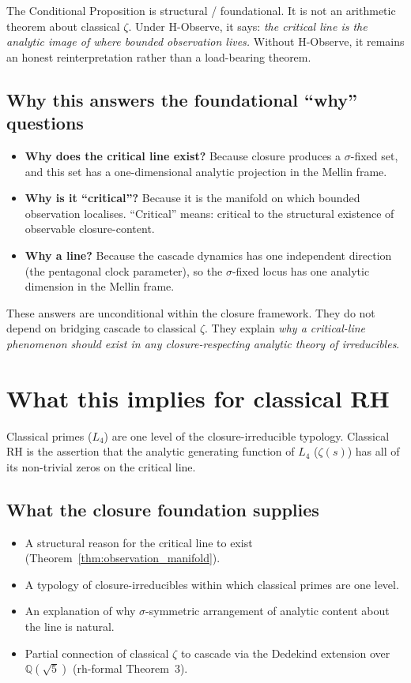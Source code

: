 \documentclass[11pt,a4paper]{article}
\theoremstyle{definition}
\theoremstyle{remark}
\begin{document}
The Conditional Proposition is structural / foundational. It is not an
arithmetic theorem about classical $\zeta$. Under H-Observe, it says:
\emph{the critical line is the analytic image of where bounded
observation lives.} Without H-Observe, it remains an honest
reinterpretation rather than a load-bearing theorem.

\subsection{Why this answers the foundational ``why'' questions}\label{ssec:why_answered}

\begin{itemize}\itemsep0pt
  \item \textbf{Why does the critical line exist?} Because closure produces a $\sigma$-fixed set, and this set has a one-dimensional analytic projection in the Mellin frame.
  \item \textbf{Why is it ``critical''?} Because it is the manifold on which bounded observation localises. ``Critical'' means: critical to the structural existence of observable closure-content.
  \item \textbf{Why a line?} Because the cascade dynamics has one independent direction (the pentagonal clock parameter), so the $\sigma$-fixed locus has one analytic dimension in the Mellin frame.
\end{itemize}

These answers are unconditional within the closure framework. They do
not depend on bridging cascade to classical $\zeta$. They explain
\emph{why a critical-line phenomenon should exist in any closure-respecting
analytic theory of irreducibles}.

\section{What this implies for classical RH}\label{sec:rh_implications}

Classical primes ($L_4$) are one level of the closure-irreducible
typology. Classical RH is the assertion that the analytic generating
function of $L_4$ ($\zeta(s)$) has all of its non-trivial zeros on the
critical line.

\subsection{What the closure foundation supplies}

\begin{itemize}\itemsep0pt
  \item A structural reason for the critical line to exist (Theorem~\ref{thm:observation_manifold}).
  \item A typology of closure-irreducibles within which classical primes are one level.
  \item An explanation of why $\sigma$-symmetric arrangement of analytic content about the line is natural.
  \item Partial connection of classical $\zeta$ to cascade via the Dedekind extension over $\mathbb{Q}(\sqrt{5})$ (rh-formal Theorem~$3$).
\end{itemize}
\end{document}
